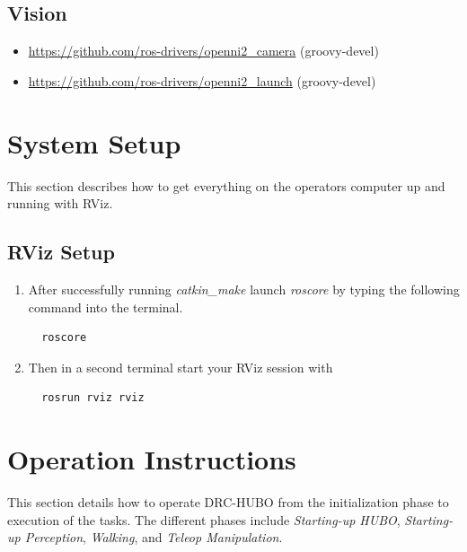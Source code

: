 \documentclass[letterpaper, 10 pt]{report}
\begin{document}
\section{Vision}
\begin{itemize}
  \item \url{https://github.com/ros-drivers/openni2\_camera} (groovy-devel)
  \item \url{https://github.com/ros-drivers/openni2\_launch} (groovy-devel)
\end{itemize}
\newpage

%

\chapter{System Setup}\label{chap:system-setup}
This section describes how to get everything on the operators computer up and running with RViz.
\section{RViz Setup}
\begin{enumerate}
  \item After successfully running \textit{catkin\_make} launch \textit{roscore} by typing the following command into the terminal.
  \begin{lstlisting}
  roscore
  \end{lstlisting}
  \item Then in a second terminal start your RViz session with
  \begin{lstlisting}
  rosrun rviz rviz
  \end{lstlisting}
\end{enumerate}

\pagebreak
\chapter{Operation Instructions}\label{chap:operating-instructions}
This section details how to operate DRC-HUBO from the initialization phase to execution of the tasks. The different phases include \textit{Starting-up HUBO}, \textit{Starting-up Perception}, \textit{Walking}, and \textit{Teleop Manipulation}.
\end{document}
